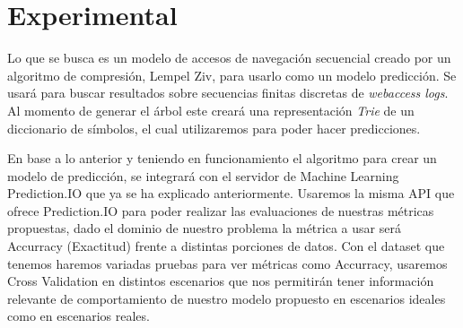 \chapter[Experimental]{Experimental}





{
}

Lo que se busca es un modelo de accesos de navegación secuencial creado por un algoritmo de compresión, Lempel Ziv,  para usarlo como un modelo  predicción. Se usará para buscar resultados sobre secuencias finitas discretas de \emph{webaccess logs}. Al momento de generar el árbol este creará una representación \emph{Trie} de un diccionario de símbolos, el cual utilizaremos para poder hacer predicciones.

En base a lo anterior y teniendo en funcionamiento el algoritmo para crear un modelo de predicción, se integrará con el servidor de Machine Learning Prediction.IO que ya se ha explicado anteriormente. Usaremos la misma API que ofrece Prediction.IO para poder realizar las evaluaciones de nuestras métricas propuestas, dado el dominio de nuestro problema la métrica a usar será Accurracy (Exactitud) frente a distintas porciones de datos. Con el dataset que tenemos haremos variadas pruebas para ver métricas como Accurracy, usaremos Cross Validation en distintos escenarios que nos permitirán tener información relevante de comportamiento de nuestro modelo propuesto en escenarios ideales como en escenarios reales.






